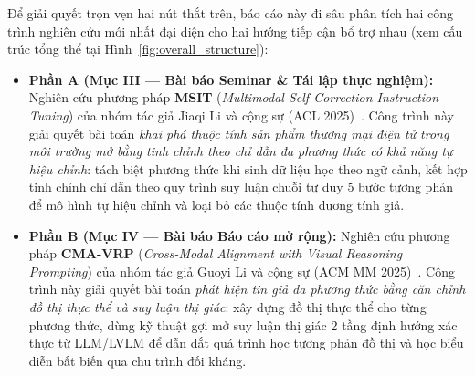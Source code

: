 \documentclass[conference,10pt]{IEEEtran}
\begin{document}
Để giải quyết trọn vẹn hai nút thắt trên, báo cáo này đi sâu phân tích hai công trình nghiên cứu mới nhất đại diện cho hai hướng tiếp cận bổ trợ nhau (xem cấu trúc tổng thể tại Hình~\ref{fig:overall_structure}):
\begin{itemize}
    \item \textbf{Phần A (Mục III --- Bài báo Seminar \& Tái lập thực nghiệm):} Nghiên cứu phương pháp \textbf{MSIT} (\textit{Multimodal Self-Correction Instruction Tuning}) của nhóm tác giả Jiaqi Li và cộng sự (ACL 2025)~\cite{li2025msit}. Công trình này giải quyết bài toán \textit{khai phá thuộc tính sản phẩm thương mại điện tử trong môi trường mở bằng tinh chỉnh theo chỉ dẫn đa phương thức có khả năng tự hiệu chỉnh}: tách biệt phương thức khi sinh dữ liệu học theo ngữ cảnh, kết hợp tinh chỉnh chỉ dẫn theo quy trình suy luận chuỗi tư duy 5 bước tương phản để mô hình tự hiệu chỉnh và loại bỏ các thuộc tính dương tính giả.
    \item \textbf{Phần B (Mục IV --- Bài báo Báo cáo mở rộng):} Nghiên cứu phương pháp \textbf{CMA-VRP} (\textit{Cross-Modal Alignment with Visual Reasoning Prompting}) của nhóm tác giả Guoyi Li và cộng sự (ACM MM 2025)~\cite{li2025cmavrp}. Công trình này giải quyết bài toán \textit{phát hiện tin giả đa phương thức bằng căn chỉnh đồ thị thực thể và suy luận thị giác}: xây dựng đồ thị thực thể cho từng phương thức, dùng kỹ thuật gợi mở suy luận thị giác 2 tầng định hướng xác thực từ LLM/LVLM để dẫn dắt quá trình học tương phản đồ thị và học biểu diễn bất biến qua chu trình đối kháng.
\end{itemize}
\end{document}
